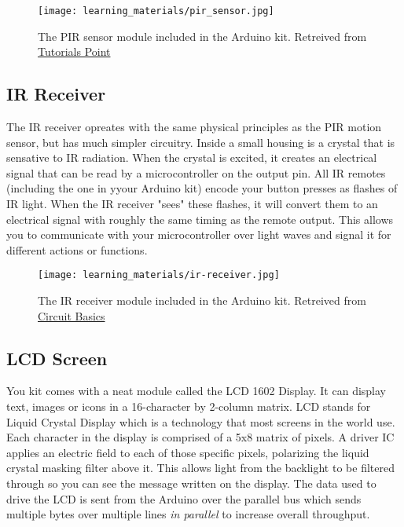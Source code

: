     \begin{figure}[h]
        \texttt{[image: learning\_materials/pir\_sensor.jpg]}
        \caption[PIR Sensor]{The PIR sensor module included in the Arduino kit. 
        Retreived from \href{https://www.tutorialspoint.com/arduino/arduino_pir_sensor.htm}
        {Tutorials Point}}
    \end{figure}

    \subsection*{IR Receiver}
    The IR receiver opreates with the same physical principles as the PIR motion sensor, but has much simpler circuitry.
    Inside a small housing is a crystal that is sensative to IR radiation.
    When the crystal is excited, it creates an electrical signal that can be read by a microcontroller on the output pin.
    All IR remotes (including the one in yyour Arduino kit) encode your button presses as flashes of IR light.
    When the IR receiver "sees" these flashes, it will convert them to an electrical signal with roughly the same timing as the remote output.
    This allows you to communicate with your microcontroller over light waves and signal it for different actions or functions. 

    \begin{figure}[h]
        \texttt{[image: learning\_materials/ir-receiver.jpg]}
        \caption[IR Receiver]{The IR receiver module included in the Arduino kit. 
        Retreived from \href{https://www.circuitbasics.com/arduino-ir-remote-receiver-tutorial/}
        {Circuit Basics}}
    \end{figure}

    \subsection*{LCD Screen}
    You kit comes with a neat module called the LCD 1602 Display.
    It can display text, images or icons in a 16-character by 2-column matrix.
    LCD stands for Liquid Crystal Display which is a technology that most screens in the world use. 
    Each character in the display is comprised of a 5x8 matrix of pixels.
    A driver IC applies an electric field to each of those specific pixels, polarizing the liquid crystal masking filter above it.
    This allows light from the backlight to be filtered through so you can see the message written on the display.
    The data used to drive the LCD is sent from the Arduino over the parallel bus which sends multiple bytes over multiple lines \textit{in parallel} to increase overall throughput.

